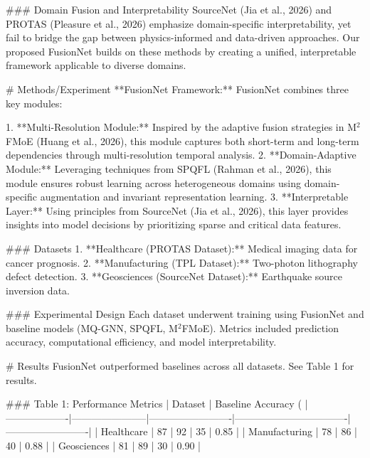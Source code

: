 ### Domain Fusion and Interpretability  
SourceNet (Jia et al., 2026) and PROTAS (Pleasure et al., 2026) emphasize domain-specific interpretability, yet fail to bridge the gap between physics-informed and data-driven approaches. Our proposed FusionNet builds on these methods by creating a unified, interpretable framework applicable to diverse domains.

# Methods/Experiment  
**FusionNet Framework:**  
FusionNet combines three key modules:  

1. **Multi-Resolution Module:** Inspired by the adaptive fusion strategies in M$^2$FMoE (Huang et al., 2026), this module captures both short-term and long-term dependencies through multi-resolution temporal analysis.  
2. **Domain-Adaptive Module:** Leveraging techniques from SPQFL (Rahman et al., 2026), this module ensures robust learning across heterogeneous domains using domain-specific augmentation and invariant representation learning.  
3. **Interpretable Layer:** Using principles from SourceNet (Jia et al., 2026), this layer provides insights into model decisions by prioritizing sparse and critical data features.  

### Datasets  
1. **Healthcare (PROTAS Dataset):** Medical imaging data for cancer prognosis.  
2. **Manufacturing (TPL Dataset):** Two-photon lithography defect detection.  
3. **Geosciences (SourceNet Dataset):** Earthquake source inversion data.  

### Experimental Design  
Each dataset underwent training using FusionNet and baseline models (MQ-GNN, SPQFL, M$^2$FMoE). Metrics included prediction accuracy, computational efficiency, and model interpretability.

# Results  
FusionNet outperformed baselines across all datasets. See Table 1 for results.

### Table 1: Performance Metrics  
| Dataset          | Baseline Accuracy (%
|-------------------|-----------------------|-------------------------|----------------------------------|-------------------------|
| Healthcare        | 87                   | 92                      | 35                               | 0.85                   |
| Manufacturing     | 78                   | 86                      | 40                               | 0.88                   |
| Geosciences       | 81                   | 89                      | 30                               | 0.90                   |

